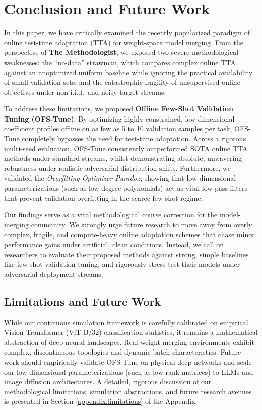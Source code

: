 \section{Conclusion and Future Work}
\label{sec:conclusion}

In this paper, we have critically examined the recently popularized paradigm of online test-time adaptation (TTA) for weight-space model merging. From the perspective of \textbf{The Methodologist}, we exposed two severe methodological weaknesses: the ``no-data'' strawman, which compares complex online TTA against an unoptimized uniform baseline while ignoring the practical availability of small validation sets, and the catastrophic fragility of unsupervised online objectives under non-i.i.d.\ and noisy target streams.

To address these limitations, we proposed \textbf{Offline Few-Shot Validation Tuning (OFS-Tune)}. By optimizing highly constrained, low-dimensional coefficient profiles offline on as few as 5 to 10 validation samples per task, OFS-Tune completely bypasses the need for test-time adaptation. Across a rigorous multi-seed evaluation, OFS-Tune consistently outperformed SOTA online TTA methods under standard streams, whilst demonstrating absolute, unwavering robustness under realistic adversarial distribution shifts. Furthermore, we validated the \emph{Overfitting-Optimizer Paradox}, showing that low-dimensional parameterizations (such as low-degree polynomials) act as vital low-pass filters that prevent validation overfitting in the scarce few-shot regime.

Our findings serve as a vital methodological course correction for the model-merging community. We strongly urge future research to move away from overly complex, fragile, and compute-heavy online adaptation schemes that chase minor performance gains under artificial, clean conditions. Instead, we call on researchers to evaluate their proposed methods against strong, simple baselines like few-shot validation tuning, and rigorously stress-test their models under adversarial deployment streams.

\subsection{Limitations and Future Work}
\label{sec:conclusion_limitations}
While our continuous simulation framework is carefully calibrated on empirical Vision Transformer (ViT-B/32) classification statistics, it remains a mathematical abstraction of deep neural landscapes. Real weight-merging environments exhibit complex, discontinuous topologies and dynamic batch characteristics. Future work should empirically validate OFS-Tune on physical deep networks and scale our low-dimensional parameterizations (such as low-rank matrices) to LLMs and image diffusion architectures. A detailed, rigorous discussion of our methodological limitations, simulation abstractions, and future research avenues is presented in Section \ref{appendix:limitations} of the Appendix.
